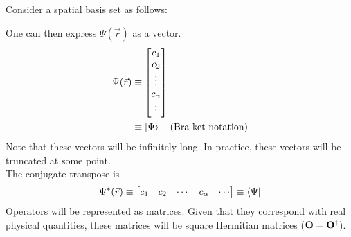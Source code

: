 \documentclass[12pt,a4paper,titlepage]{article}
\newcommand{\trm}[1]{\textrm{#1}} %
\begin{document}
Consider a spatial basis set as follows:
\begin{center}
\end{center}
One can then express $\Psi(\vec{r})$ as a vector.
\begin{equation}
\begin{aligned}
\Psi(\vec{r})&\equiv \mqty[c_{1} \\ c_{2} \\ \vdots \\ c_{\alpha} \\ \vdots]\\
&\equiv\ket{\Psi}\quad\trm{(Bra-ket notation)}
\end{aligned}
\end{equation}
Note that these vectors will be infinitely long. In practice, these vectors will be truncated at some point.\\

The conjugate transpose is
\begin{equation}
\Psi^{*}(\vec{r})\equiv\mqty[c_{1} & c_{2} & \cdots & c_{\alpha} & \cdots]\equiv\bra{\Psi}
\end{equation}
Operators will be represented as matrices. Given that they correspond with real physical quantities, these matrices will be square Hermitian matrices ($\vb{O}=\vb{O}^{\dagger}$).
\end{document}
